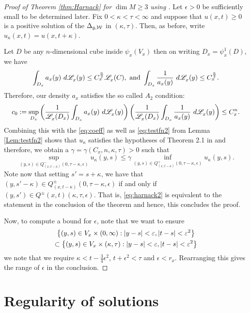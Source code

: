 \documentclass[a4paper, 12pt]{amsart}
\begin{document}
\begin{proof}[Proof of Theorem \ref{thm:Harnack} for $\dim M \geq 3$ using \cite{CS}]
Let $\epsilon > 0$ be sufficiently small to 
be determined later. 
Fix $0 < \kappa < \tau < \infty$ and suppose that $u(x,t) \geq 0$ 
is a positive solution of
the $\Delta_{g,\mathcal{W}}$ in $(\kappa,\tau)$. 
Then, as before, write $u_\kappa(x,t) = u(x,t+\kappa)$.

Let $D$ be any $n$-dimensional cube inside $\psi_x(V_x)$ then 
on writing $D_x = \psi_x^{1}(D)$, we have  
$$ \int_{D_x} a_x(y)\ d\Leb_x(y) \leq C_x^{\frac{n}{2}} \Leb_x(C),
\ \text{and}\ 
\int_{D_x} \frac{1}{a_x(y)}\ d\Leb_x(y) \leq C_x^{\frac{n}{2}}.$$
Therefore, our density $a_x$ satisfies the so called $A_2$ condition:
$$c_0 := \sup_{D_x} \left( \frac{1}{\mathscr{L}^{{}}_x(D_x)} \int_{D_x} a_x(y)\ d\mathscr{L}^{{}}_x(y)\right)
\left( \frac{1}{\mathscr{L}^{{}}_x(D_x)} \int_{D_x} \frac{1}{a_x(y)}\ d\mathscr{L}^{{}}_x(y)\right) 
	\leq C_x^n.$$
Combining this with the \eqref{eq:coeff} as
well as \eqref{eq:testfn2} from Lemma \ref{Lem:testfn2} shows that $u_\kappa$
satisfies the hypotheses of Theorem 2.1 in \cite{CS} and
therefore, we obtain a $\gamma = \gamma(C_x, n, \kappa, \tau) > 0$
such that 
\begin{equation} 
\label{eq:harnack2} 
\sup_{(y,s) \in Q_{(x,t-\kappa)}^-(0, \tau - \kappa, \epsilon)} u_\kappa(y,s)
		\leq \gamma \inf_{(y,s) \in Q^+_{(x,t-\kappa)}(0, \tau - \kappa, \epsilon)} u_\kappa(y,s).
\end{equation}
Note now that setting $s' = s + \kappa$, we have that
$(y, s' - \kappa) \in Q^{\pm}_{(x,t- \kappa)}(0, \tau - \kappa, \epsilon)$
if and only if $(y, s') \in Q^{\pm}(x,t)(\kappa, \tau, \epsilon)$.
That is, \eqref{eq:harnack2} is equivalent to the statement 
in the conclusion of the theorem and hence, this concludes
the proof.

Now, to compute a bound for $\epsilon$, note that
we want to ensure 
\begin{multline*}\left\{(y,s) \in V_x \times (0, \infty): |y - s| < \varepsilon, |t - s| < \varepsilon^2\right\} \\
\subset \left\{(y,s) \in V_x \times (\kappa, \tau): |y - s| < \varepsilon, |t - s| < \varepsilon^2\right\}
\end{multline*} 
we note that we require $\kappa < t - \frac{3}{4} \epsilon^2$,
$t + \epsilon^2 < \tau$ and $\epsilon < r_x$.
Rearranging this gives the range of $\epsilon$
in the conclusion.
\end{proof} 

\section{Regularity of solutions}
\end{document}
